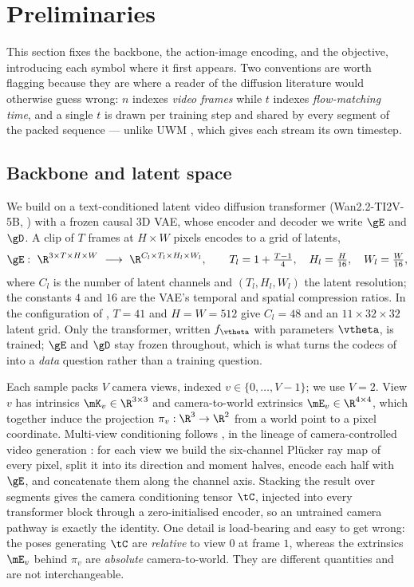 \documentclass{article} %
\begin{document}
\section{Preliminaries}
\label{sec:prelim}

This section fixes the backbone, the action-image encoding, and the objective, introducing each
symbol where it first appears. Two conventions are worth flagging because they are where a reader
of the diffusion literature would otherwise guess wrong: $n$ indexes \emph{video frames} while $t$
indexes \emph{flow-matching time}, and a single $t$ is drawn per training step and shared by every
segment of the packed sequence --- unlike UWM \citep{zhu2025unified}, which gives each stream its
own timestep.

\subsection{Backbone and latent space}
\label{sec:backbone}

We build on a text-conditioned latent video diffusion transformer (Wan2.2-TI2V-5B,
\citealp{wan2025}) with a frozen causal 3D VAE, whose encoder and decoder we write $\gE$ and
$\gD$. A clip of $T$ frames at $H\!\times\!W$ pixels encodes to a grid of latents,
\begin{equation}
\gE:\ \R^{3\times T\times H\times W}\ \longrightarrow\ \R^{C_l\times T_l\times H_l\times W_l},
\qquad T_l = 1+\tfrac{T-1}{4},\quad H_l=\tfrac{H}{16},\quad W_l=\tfrac{W}{16},
\label{eq:vae}
\end{equation}
where $C_l$ is the number of latent channels and $(T_l,H_l,W_l)$ the latent resolution; the
constants $4$ and $16$ are the VAE's temporal and spatial compression ratios. In the configuration
of , $T=41$ and $H=W=512$ give $C_l=48$ and an $11\times32\times32$ latent grid.
Only the transformer, written $f_{\vtheta}$ with parameters $\vtheta$, is trained; $\gE$ and $\gD$
stay frozen throughout, which is what turns the codecs of  into a \emph{data}
question rather than a training question.

Each sample packs $V$ camera views, indexed $v\in\{0,\dots,V-1\}$; we use $V=2$. View $v$ has
intrinsics $\mK_v\in\R^{3\times3}$ and camera-to-world extrinsics $\mE_v\in\R^{4\times4}$, which
together induce the projection $\pi_v:\R^3\to\R^2$ from a world point to a pixel coordinate.
Multi-view conditioning follows \citet{zhen2026action}, in the lineage of camera-controlled video
generation \citep{bai2025recammaster}: for each view we build the six-channel Pl\"ucker ray map
\citep{sitzmann2021lfn} of every pixel, split it into its direction and moment halves, encode each
half with $\gE$, and concatenate them along the channel axis. Stacking the result over segments
gives the camera conditioning tensor $\tC$, injected into every transformer block through a
zero-initialised encoder, so an untrained camera pathway is exactly the identity. One detail is
load-bearing and easy to get wrong: the poses generating $\tC$ are \emph{relative} to view $0$ at
frame $1$, whereas the extrinsics $\mE_v$ behind $\pi_v$ are \emph{absolute} camera-to-world. They
are different quantities and are not interchangeable.
\end{document}
